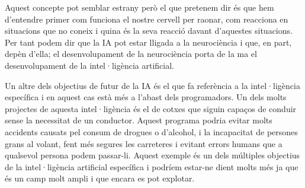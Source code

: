  Aquest concepte pot semblar estrany però el que pretenem dir és que hem d'entendre primer com funciona el nostre cervell
per raonar, com reacciona en situacions que no coneix i quina és la seva reacció davant d'aquestes situacions. Per tant podem dir que la IA pot estar lligada a la neurociència i que, en part,
depèn d'ella; el desenvolupament de la neurociència porta de la ma el desenvolupament de la intel·ligència artificial.


Un altre dels objectius de futur de la IA és el que fa referència a la intel·ligència específica i en aquest cas està més a l'abast dels programadors. Un dels molts projectes de aquesta
intel·ligència és el de cotxes que siguin capaços de conduir sense la necessitat de un conductor. Aquest programa podria evitar molts accidents causats pel consum de drogues o
d'alcohol, i la incapacitat de persones grans al volant, fent més segures les carreteres i evitant errors humans que a qualsevol persona podem passar-li. Aquest exemple és un dels múltiples
objectius de la intel·ligència artificial específica i podríem estar-ne dient molts més ja que és un camp molt ampli i que encara es pot explotar.



